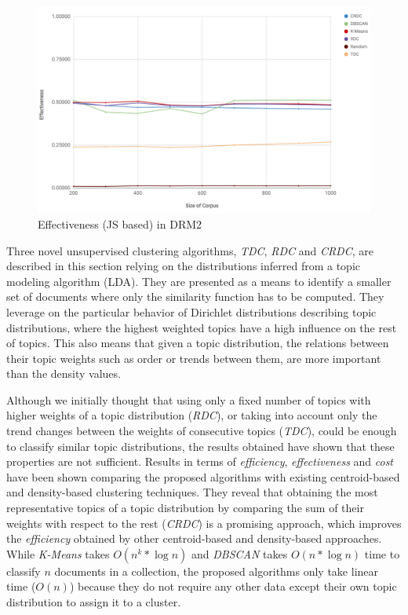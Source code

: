 \begin{figure}[!htb]\centering
  \center
  \includegraphics[scale=0.45]{effectivenessDRM2JS.png}
  \caption{Effectiveness (JS based) in DRM2}
  \label{fig:effectivenessDRM2JS}
\end{figure}


Three novel unsupervised clustering algorithms, \textit{TDC}, \textit{RDC} and \textit{CRDC}, are described in this section relying on the distributions inferred from a topic modeling algorithm (LDA). They are presented as a means to identify a smaller set of documents where only the similarity function has to be computed. They leverage on the particular behavior of Dirichlet distributions describing topic distributions, where the highest weighted topics have a high influence on the rest of topics. This also means that given a topic distribution, the relations between their topic weights such as order or trends between them, are more important than the density values.

Although we initially thought that using only a fixed number of topics with higher weights of a topic distribution (\textit{RDC}), or taking into account only the trend changes between the weights of consecutive topics (\textit{TDC}), could be enough to classify similar topic distributions, the results obtained have shown that these properties are not sufficient. Results in terms of \textit{efficiency}, \textit{effectiveness} and \textit{cost} have been shown comparing the proposed algorithms with existing centroid-based and density-based clustering techniques. They reveal that obtaining the most representative topics of a topic distribution  by comparing the sum of their weights with respect to the rest (\textit{CRDC}) is a promising approach, which improves the \textit{efficiency} obtained by other centroid-based and density-based approaches. While \textit{K-Means} takes $O(n^k * \log{n})$ and \textit{DBSCAN} takes $O(n * \log{n})$ time to classify $n$ documents in a collection, the proposed algorithms only take linear time ($O(n)$) because they do not require any other data except their own topic distribution to assign it to a cluster.


